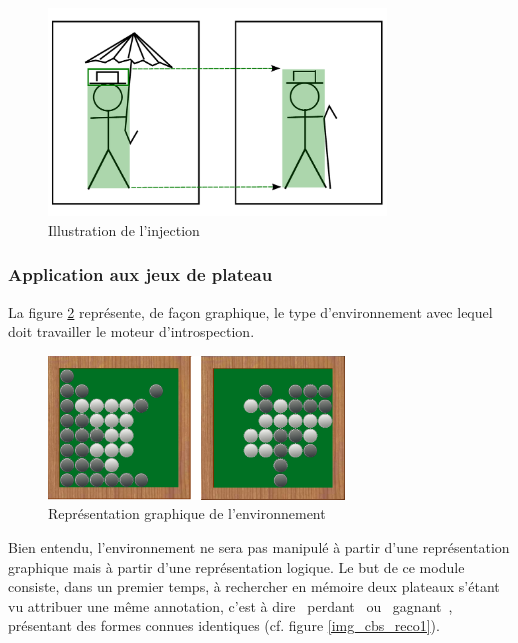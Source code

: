 \begin{figure}[H] 
\begin{center}
\includegraphics[width=0.8\textwidth]{files/raisonneur/reconnaissance_de_formes_injection} 
\end{center}
\caption{Illustration de l'injection} 
\label{img_reco_forme_injection}
\end{figure}

\subsubsection{Application aux jeux de plateau}

La figure \ref{img_cbs_reco0} représente, de façon graphique, le type d'environnement avec lequel doit travailler le moteur d'introspection.

\begin{figure}[H] 
\begin{center}
\includegraphics[width=0.7\textwidth]{files/raisonneur/cbs_reco0} 
\end{center}
\caption{Représentation graphique de l'environnement} 
\label{img_cbs_reco0}
\end{figure}

Bien entendu, l'environnement ne sera pas manipulé à partir d'une représentation graphique mais à partir d'une représentation logique. Le but de ce module consiste, dans un premier temps, à rechercher en mémoire deux plateaux s'étant vu attribuer une même annotation, c'est à dire \og{}~perdant~\fg{} ou \og{}~gagnant~\fg{}, présentant des formes connues identiques (cf. figure \ref{img_cbs_reco1}).

